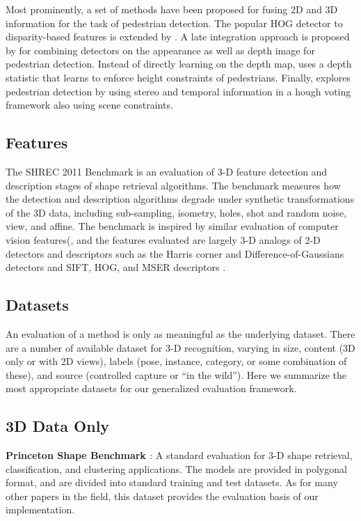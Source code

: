 Most prominently, a set of methods have been proposed for fusing 2D and 3D information for the task of pedestrian detection.
The popular HOG detector \cite{Dalal2005} to disparity-based features is extended by \cite{hattori}.
A late integration approach is proposed by \cite{rohrbach09dagm} for combining detectors on the appearance as well as depth image for pedestrian detection.
Instead of directly learning on the depth map, \cite{walk10eccv} uses a depth statistic that learns to enforce height constraints of pedestrians.
Finally, \cite{leibe10ijrr} explores pedestrian detection by using stereo and temporal information in a hough voting framework also using scene constraints.

\subsection{Features}

The SHREC 2011 Benchmark \cite{Boyer2011} is an evaluation of 3-D feature detection and description stages of shape retrieval algorithms.
The benchmark measures how the detection and description algorithms degrade under synthetic transformations of the 3D data, including sub-sampling, isometry, holes, shot and random noise, view, and affine.
The benchmark is inspired by similar evaluation of computer vision features(\cite{Mikolajczyk2004,Mikolajczyk2005}, and the features evaluated are largely 3-D analogs of 2-D detectors and descriptors such as the Harris corner and Difference-of-Gaussians \cite{Harris1988,Lowe2004} detectors and SIFT, HOG, and MSER descriptors \cite{Lowe2004,Dalal2005,Matas2004}.

\subsection{Datasets}

An evaluation of a method is only as meaningful as the underlying dataset.
There are a number of available dataset for 3-D recognition, varying in size, content (3D only or with 2D views), labels (pose, instance, category, or some combination of these), and source (controlled capture or ``in the wild'').
Here we summarize the most appropriate datasets for our generalized evaluation framework.

\subsection{3D Data Only}
{\bf Princeton Shape Benchmark \cite{Shilane2004}}:
A standard evaluation for 3-D shape retrieval, classification, and clustering applications.
The models are provided in polygonal format, and are divided into standard training and test datasets.
As for many other papers in the field, this dataset provides the evaluation basis of our implementation.


